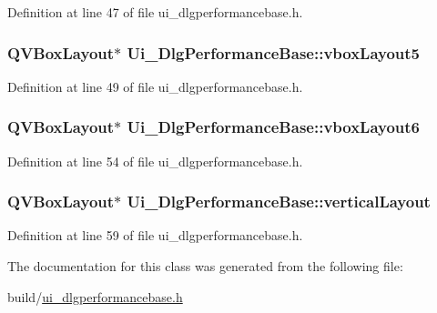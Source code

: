 Definition at line 47 of file ui\+\_\+dlgperformancebase.\+h.

\hypertarget{classUi__DlgPerformanceBase_aca07571304c349fac4fe04a617341403}{
\subsubsection[{vbox\+Layout5}]{\setlength{\rightskip}{0pt plus 5cm}Q\+V\+Box\+Layout$\ast$ Ui\+\_\+\+Dlg\+Performance\+Base\+::vbox\+Layout5}}\label{classUi__DlgPerformanceBase_aca07571304c349fac4fe04a617341403}


Definition at line 49 of file ui\+\_\+dlgperformancebase.\+h.

\hypertarget{classUi__DlgPerformanceBase_a5e1a35e3b393bb87cf89a1546138f186}{
\subsubsection[{vbox\+Layout6}]{\setlength{\rightskip}{0pt plus 5cm}Q\+V\+Box\+Layout$\ast$ Ui\+\_\+\+Dlg\+Performance\+Base\+::vbox\+Layout6}}\label{classUi__DlgPerformanceBase_a5e1a35e3b393bb87cf89a1546138f186}


Definition at line 54 of file ui\+\_\+dlgperformancebase.\+h.

\hypertarget{classUi__DlgPerformanceBase_a76a6b51ca5ca1453077c22f2622a33cf}{
\subsubsection[{vertical\+Layout}]{\setlength{\rightskip}{0pt plus 5cm}Q\+V\+Box\+Layout$\ast$ Ui\+\_\+\+Dlg\+Performance\+Base\+::vertical\+Layout}}\label{classUi__DlgPerformanceBase_a76a6b51ca5ca1453077c22f2622a33cf}


Definition at line 59 of file ui\+\_\+dlgperformancebase.\+h.



The documentation for this class was generated from the following file\+:\begin{DoxyCompactItemize}
\item 
build/\hyperlink{ui__dlgperformancebase_8h}{ui\+\_\+dlgperformancebase.\+h}\end{DoxyCompactItemize}
